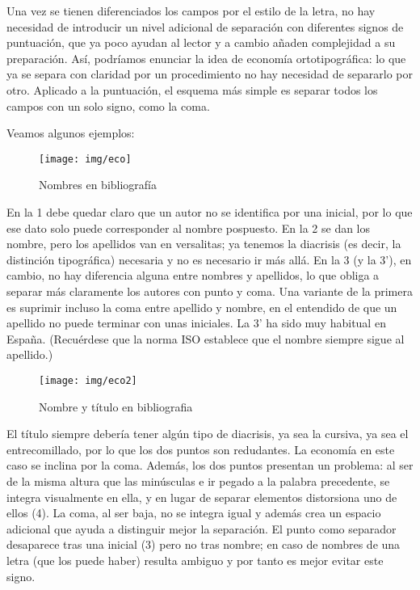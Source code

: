 Una vez se tienen diferenciados los campos por el estilo de la letra, no hay necesidad de introducir un nivel adicional de separación con diferentes signos de puntuación, que ya poco ayudan al lector y a cambio añaden complejidad a su preparación. Así, podríamos enunciar la idea de economía ortotipográfica: lo que ya se separa con claridad por un procedimiento no hay necesidad de separarlo por otro. Aplicado a la puntuación, el esquema más simple es separar todos los campos con un solo signo, como la coma.

Veamos algunos ejemplos: 
\begin{figure}[hb]
\begin{center}
\texttt{[image: img/eco]}
\caption{Nombres en bibliografía}
\end{center}
\end{figure}


En la 1 debe quedar claro que un autor no se identifica por una inicial, por lo que ese dato solo puede corresponder al nombre pospuesto. En la 2 se dan los nombre, pero los apellidos van en versalitas; ya tenemos la diacrisis (es decir, la distinción tipográfica) necesaria y no es necesario ir más allá. En la 3 (y la 3'), en cambio, no hay diferencia alguna entre nombres y apellidos, lo que obliga a separar más claramente los autores con punto y coma. Una variante de la primera es suprimir incluso la coma entre apellido y nombre, en el entendido de que un apellido no puede terminar con unas iniciales. La 3' ha sido muy habitual en España. (Recuérdese que la norma ISO establece que el nombre siempre sigue al apellido.) 

\begin{figure}[h]
\begin{center}
 \texttt{[image: img/eco2]}
 \caption{Nombre y título en bibliografia}
\end{center}
\end{figure}

El título siempre debería tener algún tipo de diacrisis, ya sea la cursiva, ya sea el entrecomillado, por lo que los dos puntos son redudantes. La economía en este caso se inclina por la coma. Además, los dos puntos presentan un problema: al ser de la misma altura que las minúsculas e ir pegado a la palabra precedente, se integra visualmente en ella, y en lugar de separar elementos distorsiona uno de ellos (4). La coma, al ser baja, no se integra igual y además crea un espacio adicional que ayuda a distinguir mejor la separación. El punto como separador desaparece tras una inicial (3) pero no tras nombre; en caso de nombres de una letra (que los puede haber) resulta ambiguo y por tanto es mejor evitar este signo. 

